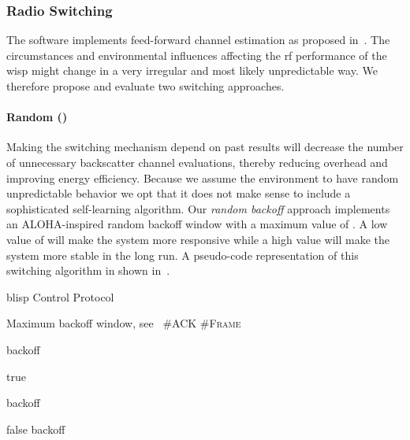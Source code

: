 \documentclass[conference,letterpaper,twoside,final,10pt]{IEEEtran}
\newcommand*\Let[2]{\State #1  #2}
\begin{document}
\subsubsection{Radio Switching}
\label{sec:software/switching}

The software implements feed-forward channel estimation as proposed in~.
The circumstances and environmental influences affecting the \ac{rf} performance of the \ac{wisp} might change in a very irregular and most likely unpredictable way.
We therefore propose and evaluate two switching approaches.

\paragraph{Random ()}
\label{sec:software/random}

Making the switching mechanism depend on past results will decrease the number of unnecessary backscatter channel evaluations, thereby reducing overhead and improving energy efficiency.
Because we assume the environment to have random unpredictable behavior we opt that it does not make sense to include a sophisticated self-learning algorithm.
Our \emph{random backoff} approach implements an ALOHA-inspired random backoff window with a maximum value of .
A low value of  will make the system more responsive while a high value will make the system more stable in the long run.
A pseudo-code representation of this switching algorithm in shown in~.

\begin{algorithm}[tb]
	\caption{\acs{blisp} Control Protocol}
	\label{alg:blisp}
	{
		\fontsize{7}{10}\selectfont
		\begin{algorithmic}[1]
		\Let{}{Maximum backoff window, see~}
			\Let{}{\textsc{\#ACK}}
			\Let{}{\textsc{\#Frame}}

			\Let{}{}

			\If{}
				\Let{backoff}{}
			\EndIf

			\If{}
				\Let{}{\textsf{true}}

				\If{}
					\Let{backoff}{}
				\EndIf

			\Else
				\Let{}{\textsf{false}}
				\Let{backoff}{}
			\EndIf

			\Let{}{}
		\EndFor
		\end{algorithmic}
	}
\end{algorithm}
\end{document}
